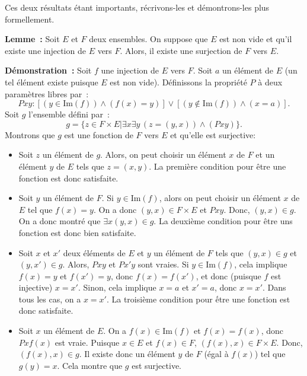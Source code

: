 Ces deux résultats étant importants, récrivons-les et démontrons-les plus formellement.

\medskip

\noindent\textbf{Lemme :} 
Soit $E$ et $F$ deux ensembles. 
On suppose que $E$ est non vide et qu'il existe une injection de $E$ vers $F$. 
Alors, il existe une surjection de $F$ vers $E$. 

\medskip

\noindent\textbf{Démonstration :}
Soit $f$ une injection de $E$ vers $F$. 
Soit $a$ un élément de $E$ (un tel élément existe puisque $E$ est non vide). 
Définissons la propriété $P$ à deux paramètres libres par : 
\begin{equation*}
    P x y: \left[(y \in \mathrm{Im}(f)) \wedge (f(x) = y) \right]
           \vee \left[(y \notin \mathrm{Im}(f)) \wedge (x=a) \right].
\end{equation*}
Soit $g$ l'ensemble défini par : 
\begin{equation*}
    g = \lbrace
        z \in F \times E \vert
        \exists x \exists y \, (z = (y,x)) \wedge (P x y)
    \rbrace .
\end{equation*}
Montrons que $g$ est une fonction de $F$ vers $E$ et qu'elle est surjective: 
\begin{itemize}[nosep]
    \item Soit $z$ un élément de $g$. 
        Alors, on peut choisir un élément $x$ de $F$ et un élément $y$ de $E$ tels que $z = (x,y)$.
        La première condition pour être une fonction est donc satisfaite. 
    \item Soit $y$ un élément de $F$. 
        Si $y \in \mathrm{Im}(f)$, alors on peut choisir un élément $x$ de $E$ tel que $f(x) = y$. 
        On a donc $(y,x) \in F \times E$ et $P x y$. 
        Donc, $(y,x) \in g$. 
        On a donc montré que $\exists x (y,x) \in g$. 
        La deuxième condition pour être uns fonction est donc bien satisfaite.
    \item Soit $x$ et $x'$ deux éléments de $E$ et $y$ un élément de $F$ tels que $(y,x) \in g$ et $(y,x') \in g$.
        Alors, $P x y$ et $P x' y$ sont vraies.
        Si $y \in \mathrm{Im}(f)$, cela implique $f(x) = y$ et $f(x') = y$, donc $f(x) = f(x')$, et donc (puisque $f$ est injective) $x = x'$.
        Sinon, cela implique $x = a$ et $x' = a$, donc $x = x'$.
        Dans tous les cas, on a $x = x'$. 
        La troisième condition pour ếtre une fonction est donc satisfaite. 
    \item Soit $x$ un élément de $E$. On a $f(x) \in \mathrm{Im}(f)$ et $f(x) = f(x)$, donc $P x f(x)$ est vraie. 
        Puisque $x \in E$ et $f(x) \in F$, $(f(x),x) \in F \times E$. 
        Donc, $(f(x),x) \in g$. 
        Il existe donc un élément $y$ de $F$ (égal à $f(x)$) tel que $g(y) = x$. 
        Cela montre que $g$ est surjective.
\end{itemize}

